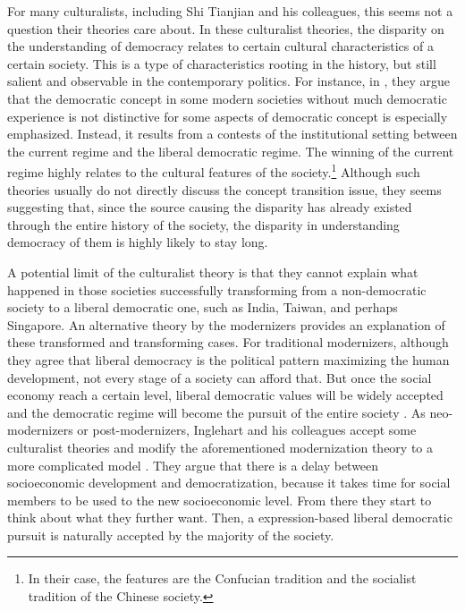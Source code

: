 \documentclass[abstracton,UTF8]{ctexart}
\begin{document}
For many culturalists, including Shi Tianjian and his colleagues, this seems not a question their theories care about. In these culturalist theories, the disparity on the understanding of democracy relates to certain cultural characteristics of a certain society. This is a type of characteristics rooting in the history, but still salient and observable in the contemporary politics. For instance, in \citet{Lu2014a}, they argue that the democratic concept in some modern societies without much democratic experience is not distinctive for some aspects of democratic concept is especially emphasized. Instead, it results from a contests of the institutional setting between the current regime and the liberal democratic regime. The winning of the current regime highly relates to the cultural features of the society.\footnote{In their case, the features are the Confucian tradition and the socialist tradition of the Chinese society.} Although such theories usually do not directly discuss the concept transition issue, they seems suggesting that, since the source causing the disparity has already existed through the entire history of the society, the disparity in understanding democracy of them is highly likely to stay long.

A potential limit of the culturalist theory is that they cannot explain what happened in those societies successfully transforming from a non-democratic society to a liberal democratic one, such as India, Taiwan, and perhaps Singapore. An alternative theory by the modernizers provides an explanation of these transformed and transforming cases. For traditional modernizers, although they agree that liberal democracy is the political pattern maximizing the human development, not every stage of a society can afford that. But once the social economy reach a certain level, liberal democratic values will be widely accepted and the democratic regime will become the pursuit of the entire society \citep{Lipset1960,Przeworski2000}. As neo-modernizers or post-modernizers, Inglehart and his colleagues accept some culturalist theories and modify the aforementioned modernization theory to a more complicated model \citep{Inglehart1997,Inglehart2005,Norris2011a}. They argue that there is a delay between socioeconomic development and democratization, because it takes time for social members to be used to the new socioeconomic level. From there they start to think about what they further want. Then, a expression-based liberal democratic pursuit is naturally accepted by the majority of the society. 
\end{document}
